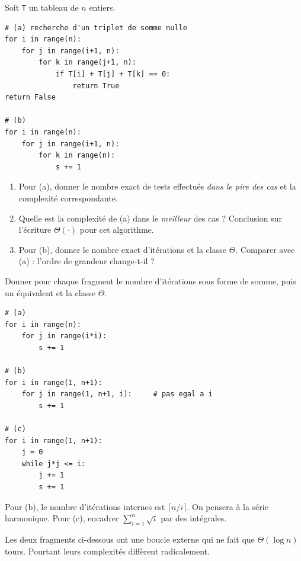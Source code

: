 \documentclass[11pt,a4paper]{article}
\begin{document}
Soit \texttt{T} un tableau de $n$ entiers.

\begin{lstlisting}
# (a) recherche d'un triplet de somme nulle
for i in range(n):
    for j in range(i+1, n):
        for k in range(j+1, n):
            if T[i] + T[j] + T[k] == 0:
                return True
return False

# (b)
for i in range(n):
    for j in range(i+1, n):
        for k in range(n):
            s += 1
\end{lstlisting}

\begin{enumerate}[label=\arabic*.,leftmargin=*]
  \item Pour (a), donner le nombre exact de tests effectués \emph{dans le pire des cas}
        et la complexité correspondante.
  \item Quelle est la complexité de (a) dans le \emph{meilleur} des cas ? Conclusion
        sur l'écriture $\Theta(\cdot)$ pour cet algorithme.
  \item Pour (b), donner le nombre exact d'itérations et la classe $\Theta$.
        Comparer avec (a) : l'ordre de grandeur change-t-il ?
\end{enumerate}

Donner pour chaque fragment le nombre d'itérations sous forme de somme, puis un
équivalent et la classe $\Theta$.

\begin{lstlisting}
# (a)
for i in range(n):
    for j in range(i*i):
        s += 1

# (b)
for i in range(1, n+1):
    for j in range(1, n+1, i):     # pas egal a i
        s += 1

# (c)
for i in range(1, n+1):
    j = 0
    while j*j <= i:
        j += 1
        s += 1
\end{lstlisting}

\begin{indication}
Pour (b), le nombre d'itérations internes est $\big\lceil n/i\big\rceil$.
On pensera à la série harmonique. Pour (c), encadrer $\sum_{i=1}^{n}\sqrt{i}$
par des intégrales.
\end{indication}

Les deux fragments ci-dessous ont une boucle externe qui ne fait que
$\Theta(\log n)$ tours. Pourtant leurs complexités diffèrent radicalement.
\end{document}
